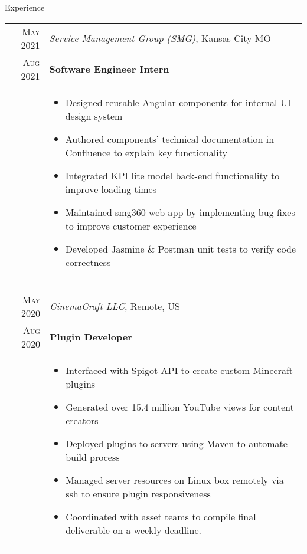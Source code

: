 \documentclass{resume}
\begin{document}
\begin{rSection}{Experience}
\small
{
  \begin{tabular}{r|p{15cm}}
    \textsc{May 2021} & \textit{Service Management Group (SMG)}, Kansas City MO \\
    \textsc{Aug 2021}  & \textbf{Software Engineer Intern} \\ &
    \begin{itemize}
      \item {Designed reusable Angular components for internal UI design system}
      \item {Authored components' technical documentation in Confluence to explain key functionality}
      \item {Integrated KPI lite model back-end functionality to improve loading times}
      \item {Maintained smg360 web app by implementing bug fixes to improve customer experience}
      \item {Developed Jasmine \& Postman unit tests to verify code correctness}
    \end{itemize}
  \end{tabular}
  
  \begin{tabular}{r|p{15cm}}
    \textsc{May 2020} & \textit{CinemaCraft LLC}, Remote, US \\
    \textsc{Aug 2020} & \textbf{Plugin Developer} \\ &
    \begin{itemize}
      \item {Interfaced with Spigot API to create custom Minecraft plugins}
      \item {Generated over 15.4 million YouTube views for content creators}
      \item {Deployed plugins to servers using Maven to automate build process}
      \item {Managed server resources on Linux box remotely via ssh to ensure plugin responsiveness}
      \item {Coordinated with asset teams to compile final deliverable on a weekly deadline.}
    \end{itemize}
  \end{tabular}
  
}
\end{rSection}
\end{document}
